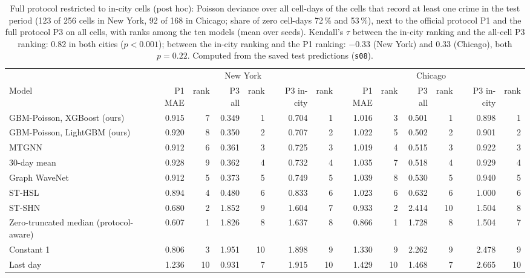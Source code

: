 \documentclass[11pt]{article}
\begin{document}
\begin{table}[H]\centering\scriptsize\setlength{\tabcolsep}{3pt}
\caption{Full protocol restricted to in-city cells (post hoc): Poisson deviance over all cell-days of the cells that record at least one crime in the test period (123 of 256 cells in New York, 92 of 168 in Chicago; share of zero cell-days 72\,\% and 53\,\%), next to the official protocol P1 and the full protocol P3 on all cells, with ranks among the ten models (mean over seeds). Kendall's $\tau$ between the in-city ranking and the all-cell P3 ranking: 0.82 in both cities ($p<0.001$); between the in-city ranking and the P1 ranking: $-0.33$ (New York) and $0.33$ (Chicago), both $p=0.22$. Computed from the saved test predictions (\texttt{s08}).}\label{tab:s15}
\begin{adjustbox}{max width=\linewidth}\begin{tabular}{lrrrrrrrrrrrr}\toprule
 & \multicolumn{6}{c}{New York} & \multicolumn{6}{c}{Chicago}\\\cmidrule(lr){2-7}\cmidrule(lr){8-13}
Model & P1 MAE & rank & P3 all & rank & P3 in-city & rank & P1 MAE & rank & P3 all & rank & P3 in-city & rank\\\midrule
GBM-Poisson, XGBoost (ours) & 0.915 & 7 & 0.349 & 1 & 0.704 & 1 & 1.016 & 3 & 0.501 & 1 & 0.898 & 1 \\
GBM-Poisson, LightGBM (ours) & 0.920 & 8 & 0.350 & 2 & 0.707 & 2 & 1.022 & 5 & 0.502 & 2 & 0.901 & 2 \\
MTGNN & 0.912 & 6 & 0.361 & 3 & 0.725 & 3 & 1.019 & 4 & 0.515 & 3 & 0.922 & 3 \\
30-day mean & 0.928 & 9 & 0.362 & 4 & 0.732 & 4 & 1.035 & 7 & 0.518 & 4 & 0.929 & 4 \\
Graph WaveNet & 0.912 & 5 & 0.373 & 5 & 0.749 & 5 & 1.039 & 8 & 0.530 & 5 & 0.940 & 5 \\
ST-HSL & 0.894 & 4 & 0.480 & 6 & 0.833 & 6 & 1.023 & 6 & 0.632 & 6 & 1.000 & 6 \\
ST-SHN & 0.680 & 2 & 1.852 & 9 & 1.604 & 7 & 0.933 & 2 & 2.414 & 10 & 1.504 & 8 \\
Zero-truncated median (protocol-aware) & 0.607 & 1 & 1.826 & 8 & 1.637 & 8 & 0.866 & 1 & 1.728 & 8 & 1.504 & 7 \\
Constant 1 & 0.806 & 3 & 1.951 & 10 & 1.898 & 9 & 1.330 & 9 & 2.262 & 9 & 2.478 & 9 \\
Last day & 1.236 & 10 & 0.931 & 7 & 1.915 & 10 & 1.429 & 10 & 1.468 & 7 & 2.665 & 10 \\
\bottomrule\end{tabular}\end{adjustbox}\end{table}
\end{document}
